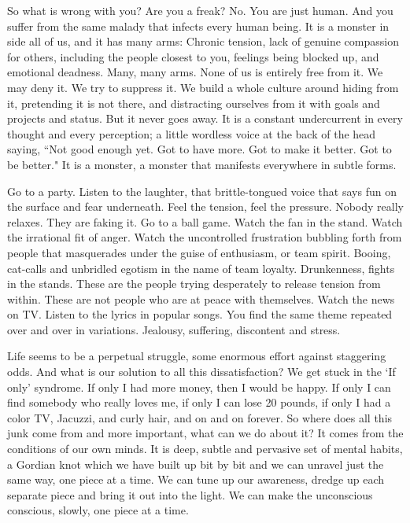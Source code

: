 So what is wrong with you? Are you a freak? No. You are just human. And you
suffer from the same malady that infects every human being. It is a monster in
side all of us, and it has many arms: Chronic tension, lack of genuine
compassion for others, including the people closest to you, feelings being
blocked up, and emotional deadness. Many, many arms. None of us is entirely free
from it. We may deny it. We try to suppress it. We build a whole culture around
hiding from it, pretending it is not there, and distracting ourselves from it
with goals and projects and status. But it never goes away. It is a constant
undercurrent in every thought and every perception; a little wordless voice at
the back of the head saying, ``Not good enough yet. Got to have more. Got to make
it better. Got to be better." It is a monster, a monster that manifests
everywhere in subtle forms.

Go to a party. Listen to the laughter, that brittle-tongued voice that says fun
on the surface and fear underneath. Feel the tension, feel the pressure. Nobody
really relaxes. They are faking it. Go to a ball game. Watch the fan in the
stand. Watch the irrational fit of anger. Watch the uncontrolled frustration
bubbling forth from people that masquerades under the guise of enthusiasm, or
team spirit. Booing, cat-calls and unbridled egotism in the name of team
loyalty. Drunkenness, fights in the stands. These are the people trying
desperately to release tension from within. These are not people who are at
peace with themselves. Watch the news on TV. Listen to the lyrics in popular
songs. You find the same theme repeated over and over in variations. Jealousy,
suffering, discontent and stress.

Life seems to be a perpetual struggle, some enormous effort against staggering
odds. And what is our solution to all this dissatisfaction? We get stuck in the
`If only' syndrome. If only I had more money, then I would be happy. If only I
can find somebody who really loves me, if only I can lose 20 pounds, if only I
had a color TV, Jacuzzi, and curly hair, and on and on forever. So where does
all this junk come from and more important, what can we do about it? It comes
from the conditions of our own minds. It is deep, subtle and pervasive set of
mental habits, a Gordian knot which we have built up bit by bit and we can
unravel just the same way, one piece at a time. We can tune up our awareness,
dredge up each separate piece and bring it out into the light. We can make the
unconscious conscious, slowly, one piece at a time.

